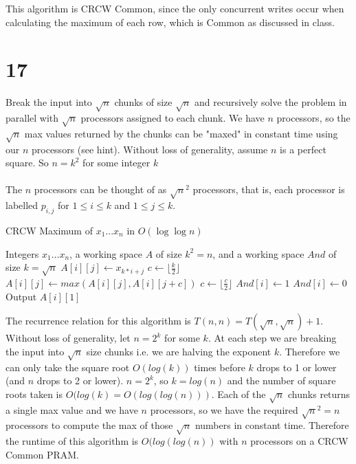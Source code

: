 \documentclass[letterpaper,notitlepage,twoside]{article}
\begin{document}
This algorithm is CRCW Common, since the only concurrent writes occur when calculating the maximum of each row, which is Common as discussed in class.

\section*{17}
Break the input into $\sqrt{n}$ chunks of size $\sqrt{n}$ and recursively solve the problem in parallel with $\sqrt{n}$ processors assigned to each chunk. We have $n$ processors, so the $\sqrt{n}$ max values returned by the chunks can be "maxed" in constant time using our $n$ processors (see hint). Without loss of generality, assume $n$ is a perfect square. So $n = k^2$ for some integer $k$
\\\\
The $n$ processors can be thought of as $\sqrt{n}^2$ processors, that is, each processor is labelled $p_{i, j}$ for $1 \leq i \leq k$ and $1 \leq j \leq k$.

\begin{algorithm}[H]
    \begin{algorithmic}%
        \caption{CRCW Maximum of $x_1...x_n$ in $O(\log\log n)$}
        \Require Integers $x_1...x_n$, a working space $A$ of size $k^2 = n$, and a working space $And$ of size $k = \sqrt{n}$
        \State $A[i][j] \gets x_{k*i + j}$ 
        \State $c \gets \lfloor \frac{k}{2} \rfloor$
            \State $A[i][j] \gets max(A[i][j], A[i][j + c])$
            \State $c \gets \lfloor \frac{c}{2} \rfloor$
        \EndWhile {}
        \State
        \State $And[i] \gets 1$ 
         
            \State $And[i] \gets 0$ 
        \EndIf
         \Comment{If $A[i]]1]$ is the maximum,}
            \State Output $A[i][1]$ 
        \EndIf
    \end{algorithmic}
\end{algorithm}

The recurrence relation for this algorithm is $T(n, n) = T(\sqrt{n}, \sqrt{n}) + 1$. \\
Without loss of generality, let $n = 2^k$ for some $k$. At each step we are breaking the input into $\sqrt{n}$ size chunks i.e. we are halving the exponent $k$. Therefore we can only take the square root $O(log(k))$ times before $k$ drops to 1 or lower (and $n$ drops to 2 or lower). $n = 2^k$, so $k = log(n)$ and the number of square roots taken is $O(log(k) = O(log(log(n)))$. Each of the $\sqrt{n}$ chunks returns a single max value and we have $n$ processors, so we have the required $\sqrt{n}^2 = n$ processors to compute the max of those $\sqrt{n}$ numbers in constant time. Therefore the runtime of this algorithm is $O(log(log(n))$ with $n$ processors on a CRCW Common PRAM.
\end{document}
